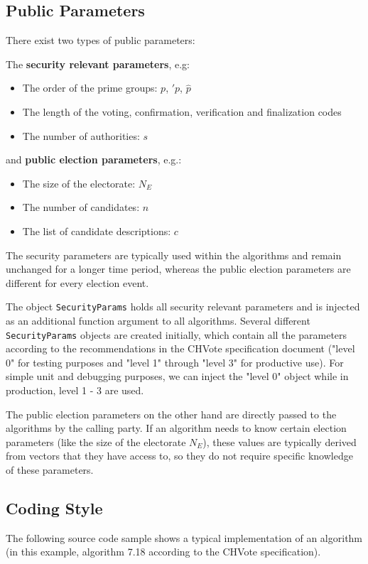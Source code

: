 \subsection{Public Parameters}
There exist two types of public parameters:

The \textbf{security relevant parameters}, e.g:

\begin{itemize}
	\item The order of the prime groups: $p$, $\prime{p}$, $\hat{p}$
	\item The length of the voting, confirmation, verification and finalization codes
	\item The number of authorities: $s$
\end{itemize}

and \textbf{public election parameters}, e.g.:

\begin{itemize}
	\item The size of the electorate: $N_E$
	\item The number of candidates: $n$
	\item The list of candidate descriptions: $c$
\end{itemize}

The security parameters are typically used within the algorithms and remain unchanged for a longer time period, whereas the public election parameters are different for every election event.

The object \texttt{SecurityParams} holds all security relevant parameters and is injected as an additional function argument to all algorithms. Several different \texttt{SecurityParams} objects are created initially, which contain all the parameters according to the recommendations in the CHVote specification document ("level 0" for testing purposes and "level 1" through "level 3" for productive use). For simple unit and debugging purposes, we can inject the "level 0" object while in production, level 1 - 3 are used.

The public election parameters on the other hand are directly passed to the algorithms by the calling party. If an algorithm needs to know certain election parameters (like the size of the electorate $N_E$), these values are typically derived from vectors that they have access to, so they do not require specific knowledge of these parameters.

\subsection{Coding Style}
The following source code sample shows a typical implementation of an algorithm (in this example, algorithm 7.18 according to the CHVote specification).

